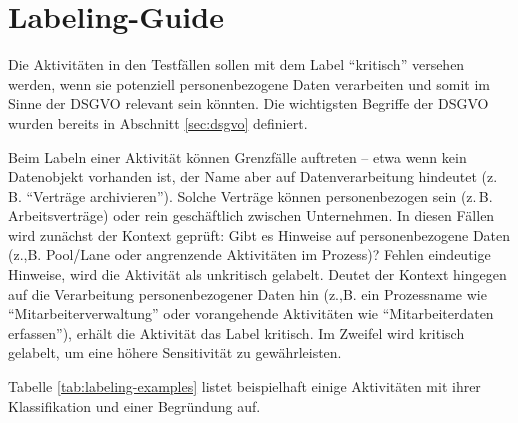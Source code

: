 \section{Labeling-Guide}\label{sec:labeling-guide}

Die Aktivitäten in den Testfällen sollen mit dem Label \enquote{kritisch} versehen werden, wenn sie potenziell personenbezogene Daten verarbeiten und somit im Sinne der \ac{DSGVO} relevant sein könnten. Die wichtigsten Begriffe der \ac{DSGVO} wurden bereits in Abschnitt \ref{sec:dsgvo} definiert.

Beim Labeln einer Aktivität können Grenzfälle auftreten – etwa wenn kein Datenobjekt vorhanden ist, der Name aber auf Datenverarbeitung hindeutet (z.\,B. \enquote{Verträge archivieren}). Solche Verträge können personenbezogen sein (z.\,B. Arbeitsverträge) oder rein geschäftlich zwischen Unternehmen. In diesen Fällen wird zunächst der Kontext geprüft: Gibt es Hinweise auf personenbezogene Daten (z.,B. Pool/Lane oder angrenzende Aktivitäten im Prozess)? Fehlen eindeutige Hinweise, wird die Aktivität als unkritisch gelabelt. Deutet der Kontext hingegen auf die Verarbeitung personenbezogener Daten hin (z.,B. ein Prozessname wie \enquote{Mitarbeiterverwaltung} oder vorangehende Aktivitäten wie \enquote{Mitarbeiterdaten erfassen}), erhält die Aktivität das Label kritisch. Im Zweifel wird kritisch gelabelt, um eine höhere Sensitivität zu gewährleisten.

Tabelle \ref{tab:labeling-examples} listet beispielhaft einige Aktivitäten mit ihrer Klassifikation und einer Begründung auf.

